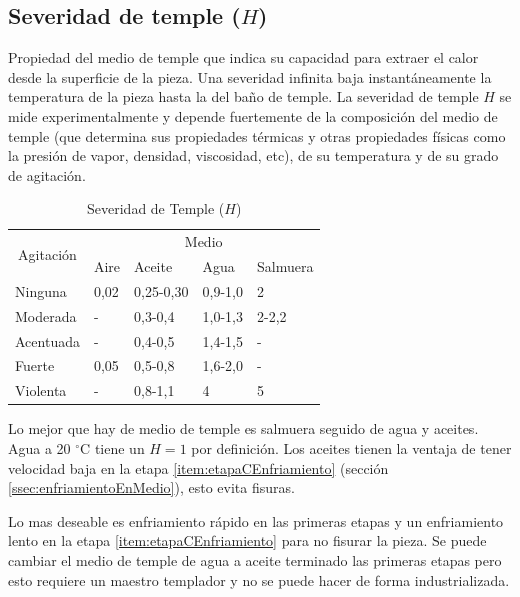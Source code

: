 \documentclass{article}
\newcommand{\grad}{\ensuremath{^\circ \mathrm{C}}}
\begin{document}
\subsection[Severidad de temple]{Severidad de temple ($H$)}
Propiedad del medio de temple que indica su capacidad para extraer el calor desde la superficie de la pieza. Una severidad infinita baja instantáneamente la temperatura de la pieza hasta la del baño de temple. La severidad de temple $H$ se mide experimentalmente y depende fuertemente de la composición del medio de temple (que determina sus propiedades térmicas y otras propiedades físicas como la presión de vapor, densidad, viscosidad, etc), de su temperatura y de su grado de agitación. 


\begin{table}[htb!]
\centering
\begin{tabular}{l|l|l|l|l}
\hline
\multicolumn{1}{c|}{\multirow{2}{*}{Agitación}} & \multicolumn{4}{c}{Medio}            \\ \cline{2-5} 
\multicolumn{1}{c|}{}                           & Aire & Aceite    & Agua    & Salmuera \\ \hline
Ninguna                                         & 0,02 & 0,25-0,30 & 0,9-1,0 & 2        \\
Moderada                                        & -    & 0,3-0,4   & 1,0-1,3 & 2-2,2    \\
Acentuada                                       & -    & 0,4-0,5   & 1,4-1,5 & -        \\
Fuerte                                          & 0,05 & 0,5-0,8   & 1,6-2,0 & -        \\
Violenta                                        & -    & 0,8-1,1   & 4       & 5        \\ \hline
\end{tabular}
\caption{Severidad de Temple ($H$)}
\label{tab:severidadTemple}
\end{table}

Lo mejor que hay de medio de temple es salmuera seguido de agua y aceites. Agua a 20 \grad{} tiene un $H=1$ por definición. Los aceites tienen la ventaja de tener velocidad baja en la etapa \ref{item:etapaCEnfriamiento} (secci\'on \ref{ssec:enfriamientoEnMedio}), esto evita fisuras. 

Lo mas deseable es enfriamiento rápido en las primeras etapas y un enfriamiento lento en la etapa \ref{item:etapaCEnfriamiento} para no fisurar la pieza. Se puede cambiar el medio de temple de agua a aceite terminado las primeras etapas pero esto requiere un maestro templador y no se puede hacer de forma industrializada.
\end{document}
